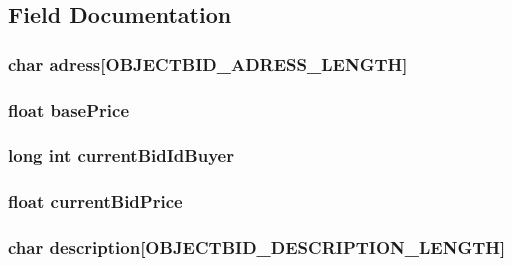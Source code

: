 \subsection{Field Documentation}
\hypertarget{struct_object_bid_a05eb87542785d73c5aa5cbe4e3a6d262}{
\subsubsection[{adress}]{\setlength{\rightskip}{0pt plus 5cm}char adress\mbox{[}{\bf O\-B\-J\-E\-C\-T\-B\-I\-D\-\_\-\-A\-D\-R\-E\-S\-S\-\_\-\-L\-E\-N\-G\-T\-H}\mbox{]}}}\label{struct_object_bid_a05eb87542785d73c5aa5cbe4e3a6d262}
\hypertarget{struct_object_bid_ad7e7bdb2bbc09612e2b037a0df5d76dd}{
\subsubsection[{base\-Price}]{\setlength{\rightskip}{0pt plus 5cm}float base\-Price}}\label{struct_object_bid_ad7e7bdb2bbc09612e2b037a0df5d76dd}
\hypertarget{struct_object_bid_aa79adfae7ada9530c98f5510fc34a0f7}{
\subsubsection[{current\-Bid\-Id\-Buyer}]{\setlength{\rightskip}{0pt plus 5cm}long int current\-Bid\-Id\-Buyer}}\label{struct_object_bid_aa79adfae7ada9530c98f5510fc34a0f7}
\hypertarget{struct_object_bid_a8864df4945a55f29bb320025d6011cc1}{
\subsubsection[{current\-Bid\-Price}]{\setlength{\rightskip}{0pt plus 5cm}float current\-Bid\-Price}}\label{struct_object_bid_a8864df4945a55f29bb320025d6011cc1}
\hypertarget{struct_object_bid_a203af9554762f924c14e5c30b24352a1}{
\subsubsection[{description}]{\setlength{\rightskip}{0pt plus 5cm}char description\mbox{[}{\bf O\-B\-J\-E\-C\-T\-B\-I\-D\-\_\-\-D\-E\-S\-C\-R\-I\-P\-T\-I\-O\-N\-\_\-\-L\-E\-N\-G\-T\-H}\mbox{]}}}\label{struct_object_bid_a203af9554762f924c14e5c30b24352a1}
